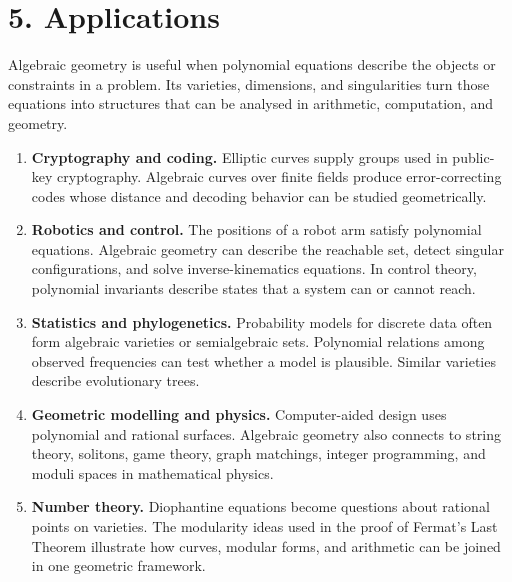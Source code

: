 \section*{5. Applications}
Algebraic geometry is useful when polynomial equations describe the objects or constraints in a problem. Its varieties, dimensions, and singularities turn those equations into structures that can be analysed in arithmetic, computation, and geometry.
\begin{enumerate}[leftmargin=*,itemsep=0.35em]
\item \textbf{Cryptography and coding.} Elliptic curves supply groups used in public-key cryptography. Algebraic curves over finite fields produce error-correcting codes whose distance and decoding behavior can be studied geometrically.
\item \textbf{Robotics and control.} The positions of a robot arm satisfy polynomial equations. Algebraic geometry can describe the reachable set, detect singular configurations, and solve inverse-kinematics equations. In control theory, polynomial invariants describe states that a system can or cannot reach.
\item \textbf{Statistics and phylogenetics.} Probability models for discrete data often form algebraic varieties or semialgebraic sets. Polynomial relations among observed frequencies can test whether a model is plausible. Similar varieties describe evolutionary trees.
\item \textbf{Geometric modelling and physics.} Computer-aided design uses polynomial and rational surfaces. Algebraic geometry also connects to string theory, solitons, game theory, graph matchings, integer programming, and moduli spaces in mathematical physics.
\item \textbf{Number theory.} Diophantine equations become questions about rational points on varieties. The modularity ideas used in the proof of Fermat's Last Theorem illustrate how curves, modular forms, and arithmetic can be joined in one geometric framework.
\end{enumerate}


